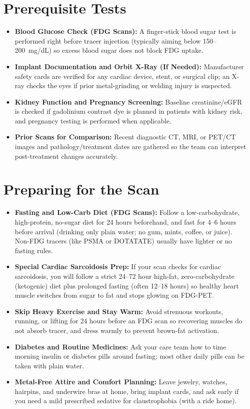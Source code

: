 \section{Prerequisite Tests}
\begin{itemize}
\item \textbf{Blood Glucose Check (FDG Scans):} A finger-stick blood sugar test is performed right before tracer injection (typically aiming below 150--200~mg/dL) so excess blood sugar does not block FDG uptake.
\item \textbf{Implant Documentation and Orbit X-Ray (If Needed):} Manufacturer safety cards are verified for any cardiac device, stent, or surgical clip; an X-ray checks the eyes if prior metal-grinding or welding injury is suspected.
\item \textbf{Kidney Function and Pregnancy Screening:} Baseline creatinine/eGFR is checked if gadolinium contrast dye is planned in patients with kidney risk, and pregnancy testing is performed when applicable.
\item \textbf{Prior Scans for Comparison:} Recent diagnostic CT, MRI, or PET/CT images and pathology/treatment dates are gathered so the team can interpret post-treatment changes accurately.
\end{itemize}

\section{Preparing for the Scan}
\begin{itemize}
\item \textbf{Fasting and Low-Carb Diet (FDG Scans):} Follow a low-carbohydrate, high-protein, no-sugar diet for 24 hours beforehand, and fast for 4--6 hours before arrival (drinking only plain water; no gum, mints, coffee, or juice). Non-FDG tracers (like PSMA or DOTATATE) usually have lighter or no fasting rules.
\item \textbf{Special Cardiac Sarcoidosis Prep:} If your scan checks for cardiac sarcoidosis, you will follow a strict 24--72 hour high-fat, zero-carbohydrate (ketogenic) diet plus prolonged fasting (often 12--18 hours) so healthy heart muscle switches from sugar to fat and stops glowing on FDG-PET.
\item \textbf{Skip Heavy Exercise and Stay Warm:} Avoid strenuous workouts, running, or lifting for 24 hours before an FDG scan so recovering muscles do not absorb tracer, and dress warmly to prevent brown-fat activation.
\item \textbf{Diabetes and Routine Medicines:} Ask your care team how to time morning insulin or diabetes pills around fasting; most other daily pills can be taken with plain water.
\item \textbf{Metal-Free Attire and Comfort Planning:} Leave jewelry, watches, hairpins, and underwire bras at home, bring implant cards, and ask early if you need a mild prescribed sedative for claustrophobia (with a ride home).
\end{itemize}

